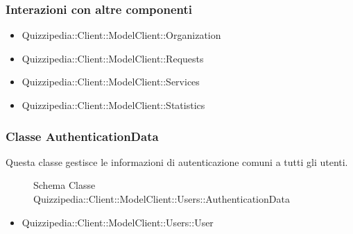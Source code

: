 \subsubsection{Interazioni con altre componenti}
\begin{itemize}
\item Quizzipedia::Client::ModelClient::Organization
\item Quizzipedia::Client::ModelClient::Requests
\item Quizzipedia::Client::ModelClient::Services
\item Quizzipedia::Client::ModelClient::Statistics
\end{itemize}
\subsubsection{Classe AuthenticationData}
Questa classe gestisce le informazioni di autenticazione comuni a tutti gli utenti.
\begin{figure}[H]
\centering
\noindent{}
\caption{Schema Classe Quizzipedia::Client::ModelClient::Users::AuthenticationData}
\end{figure}
\begin{itemize}
\item Quizzipedia::Client::ModelClient::Users::User
\end{itemize}
